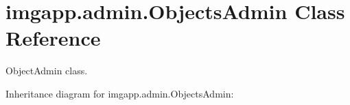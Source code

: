 \hypertarget{classimgapp_1_1admin_1_1ObjectsAdmin}{}\section{imgapp.\+admin.\+Objects\+Admin Class Reference}
\label{classimgapp_1_1admin_1_1ObjectsAdmin}


Object\+Admin class.  




Inheritance diagram for imgapp.\+admin.\+Objects\+Admin\+:
